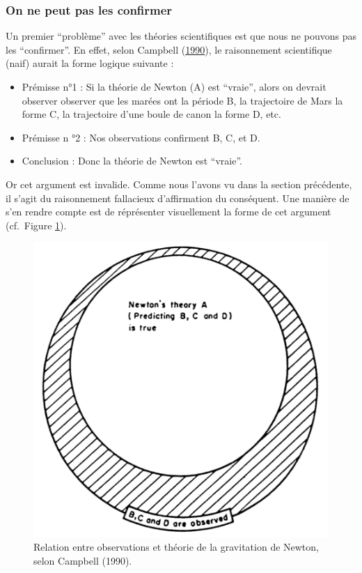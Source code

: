 \documentclass[
  a4paper,11pt,twoside,onecolumn,openright,final,oldfontcommands]{memoir}
\theoremstyle{definition}
\theoremstyle{definition}
\theoremstyle{definition}
\theoremstyle{definition}
\theoremstyle{remark}
\begin{document}
\hypertarget{on-ne-peut-pas-les-confirmer}{%
\subsubsection{On ne peut pas les confirmer}\label{on-ne-peut-pas-les-confirmer}}

Un premier ``problème'' avec les théories scientifiques est que nous ne pouvons pas les ``confirmer''. En effet, selon Campbell (\protect\hyperlink{ref-campbell_meehlian_1990}{1990}), le raisonnement scientifique (naif) aurait la forme logique suivante :

\begin{itemize}
\item
  Prémisse n°1 : Si la théorie de Newton (A) est ``vraie'', alors on devrait observer observer que les marées ont la période B, la trajectoire de Mars la forme C, la trajectoire d'une boule de canon la forme D, etc.
\item
  Prémisse n °2 : Nos observations confirment B, C, et D.
\item
  Conclusion : Donc la théorie de Newton est ``vraie''.
\end{itemize}

Or cet argument est invalide. Comme nous l'avons vu dans la section précédente, il s'agit du raisonnement fallacieux d'affirmation du conséquent. Une manière de s'en rendre compte est de réprésenter visuellement la forme de cet argument (cf.~Figure \ref{fig:campbell}).

\begin{figure}[!htb]

{\centering \includegraphics[width=0.5\linewidth]{figures/campbell} 

}

\caption{Relation entre observations et théorie de la gravitation de Newton, selon Campbell (1990).}\label{fig:campbell}
\end{figure}
\end{document}
